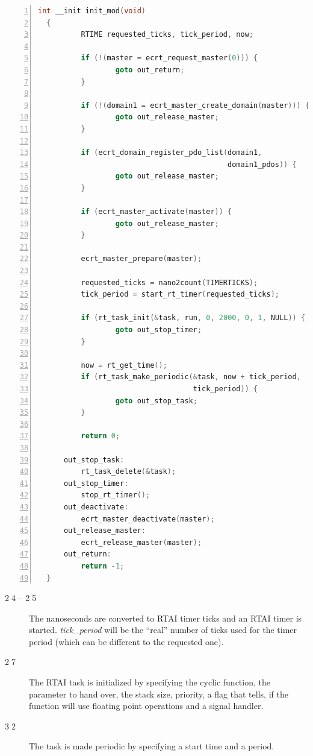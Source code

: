 \documentclass[a4paper,12pt,BCOR6mm,bibtotoc,idxtotoc]{scrbook}
\newcommand{\linenum}[1]{\normalfont\textcircled{\tiny #1}}
\begin{document}
\begin{lstlisting}[gobble=2,language=C,numbers=left,caption={RTAI module init
    function},label={lst:rtaiinit}]
  int __init init_mod(void)
  {
          RTIME requested_ticks, tick_period, now;

          if (!(master = ecrt_request_master(0))) {
                  goto out_return;
          }

          if (!(domain1 = ecrt_master_create_domain(master))) {
                  goto out_release_master;
          }

          if (ecrt_domain_register_pdo_list(domain1,
                                            domain1_pdos)) {
                  goto out_release_master;
          }

          if (ecrt_master_activate(master)) {
                  goto out_release_master;
          }

          ecrt_master_prepare(master);

          requested_ticks = nano2count(TIMERTICKS);
          tick_period = start_rt_timer(requested_ticks);

          if (rt_task_init(&task, run, 0, 2000, 0, 1, NULL)) {
                  goto out_stop_timer;
          }

          now = rt_get_time();
          if (rt_task_make_periodic(&task, now + tick_period,
                                    tick_period)) {
                  goto out_stop_task;
          }

          return 0;

      out_stop_task:
          rt_task_delete(&task);
      out_stop_timer:
          stop_rt_timer();
      out_deactivate:
          ecrt_master_deactivate(master);
      out_release_master:
          ecrt_release_master(master);
      out_return:
          return -1;
  }
\end{lstlisting}

\begin{description}
\item[\linenum{24} -- \linenum{25}] The
  nanoseconds are converted to RTAI timer ticks and an RTAI timer is
  started.  \textit{tick\_period} will be the ``real'' number of ticks
  used for the timer period (which can be different to the requested
  one).
\item[\linenum{27}] The RTAI task is initialized
  by specifying the cyclic function, the parameter to hand over, the
  stack size, priority, a flag that tells, if the function will use
  floating point operations and a signal handler.
\item[\linenum{32}] The task is made periodic by
  specifying a start time and a period.
\end{description}
\end{document}
